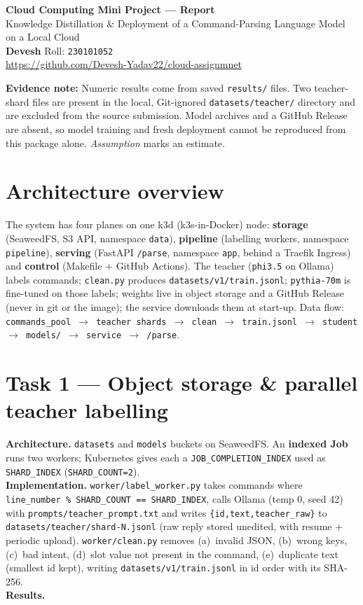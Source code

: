 \documentclass[10pt,a4paper]{article}
\newcommand{\code}[1]{\texttt{\small #1}}
\begin{document}
\begin{center}
  {\LARGE\bfseries Cloud Computing Mini Project --- Report}\\[2pt]
  {\normalsize Knowledge Distillation \& Deployment of a Command-Parsing Language Model on a Local Cloud}\\[6pt]
  \textbf{Devesh} \quad Roll: \code{230101052}\\
  \url{https://github.com/Devesh-Yadav22/cloud-assignmnet}
\end{center}

\noindent\colorbox{gray!12}{\parbox{\dimexpr\textwidth-2\fboxsep\relax}{\small
\textbf{Evidence note:} Numeric results come from saved \code{results/} files. Two teacher-shard
files are present in the local, Git-ignored \code{datasets/teacher/} directory and are excluded from
the source submission. Model archives and a GitHub Release are absent, so model training and fresh
deployment cannot be reproduced from this package alone. \textit{Assumption} marks an estimate.}}

\section{Architecture overview}
The system has four planes on one k3d (k3s-in-Docker) node: \textbf{storage} (SeaweedFS, S3 API, namespace
\code{data}), \textbf{pipeline} (labelling workers, namespace \code{pipeline}), \textbf{serving} (FastAPI
\code{/parse}, namespace \code{app}, behind a Traefik Ingress) and \textbf{control} (Makefile + GitHub
Actions). The teacher (\code{phi3.5} on Ollama) labels commands; \code{clean.py} produces
\code{datasets/v1/train.jsonl}; \code{pythia-70m} is fine-tuned on those labels; weights live in object
storage and a GitHub Release (never in git or the image); the service downloads them at start-up. Data flow:
\code{commands\_pool $\rightarrow$ teacher shards $\rightarrow$ clean $\rightarrow$ train.jsonl $\rightarrow$
student $\rightarrow$ models/ $\rightarrow$ service $\rightarrow$ /parse}.

\section{Task 1 --- Object storage \& parallel teacher labelling}
\textbf{Architecture.} \code{datasets} and \code{models} buckets on SeaweedFS. An \textbf{indexed Job} runs
two workers; Kubernetes gives each a \code{JOB\_COMPLETION\_INDEX} used as \code{SHARD\_INDEX}
(\code{SHARD\_COUNT=2}).\\
\textbf{Implementation.} \code{worker/label\_worker.py} takes commands where
\code{line\_number \% SHARD\_COUNT == SHARD\_INDEX}, calls Ollama (temp 0, seed 42) with
\code{prompts/teacher\_prompt.txt} and writes \code{\{id,text,teacher\_raw\}} to
\code{datasets/teacher/shard-N.jsonl} (raw reply stored unedited, with resume + periodic upload).
\code{worker/clean.py} removes (a)~invalid JSON, (b)~wrong keys, (c)~bad intent, (d)~slot value not present
in the command, (e)~duplicate text (smallest id kept), writing \code{datasets/v1/train.jsonl} in id order
with its SHA-256.\\
\textbf{Results.}
\end{document}
